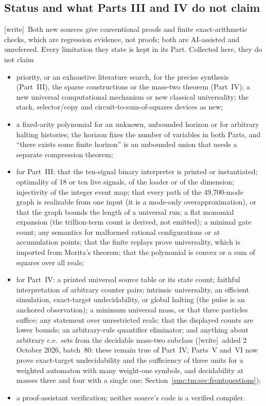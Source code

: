 \documentclass[11pt,letterpaper]{article}
\numberwithin{equation}{section}
\theoremstyle{definition}
\theoremstyle{remark}
\newcommand{\wtag}{\textup{[write]}}
\begin{document}
\subsection{Status and what Parts III and IV do not claim}\label{smc:cs:sec:status}

\wtag\ Both new sources give conventional proofs and finite exact-arithmetic checks, which are regression evidence, not proofs; both are AI-assisted and unrefereed. Every limitation they state is kept in its Part. Collected here, they do not claim
\begin{itemize}
\item priority, or an exhaustive literature search, for the precise synthesis (Part~III), the sparse constructions or the mass-two theorem (Part~IV); a new universal computational mechanism or new classical universality; the stack, selector/copy and circuit-to-sum-of-squares devices as new;
\item a fixed-arity polynomial for an unknown, unbounded horizon or for arbitrary halting histories; the horizon fixes the number of variables in both Parts, and ``there exists some finite horizon'' is an unbounded union that needs a separate compression theorem;
\item for Part~III: that the ten-signal binary interpreter is printed or instantiated; optimality of 18 or ten live signals, of the loader or of the dimension; injectivity of the integer event map; that every path of the 49,700-mode graph is realizable from one input (it is a mode-only overapproximation), or that the graph bounds the length of a universal run; a flat monomial expansion (the trillion-term count is derived, not emitted); a minimal gate count; any semantics for malformed rational configurations or at accumulation points; that the finite replays prove universality, which is imported from Morita's theorem; that the polynomial is convex or a sum of squares over all reals;
\item for Part~IV: a printed universal source table or its state count; faithful interpretation of arbitrary counter pairs; intrinsic universality, an efficient simulation, exact-target undecidability, or global halting (the pulse is an anchored observation); a minimum universal mass, or that three particles suffice; any statement over unrestricted reals; that the displayed counts are lower bounds; an arbitrary-rule quantifier eliminator; and anything about arbitrary c.e.\ sets from the decidable mass-two subclass (\wtag\ added 2 October 2026, batch~80: these remain true of Part~IV; Parts~V and~VI now prove exact-target undecidability and the sufficiency of three units for a weighted automaton with many weight-one symbols, and decidability at masses three and four with a single one; Section~\ref{smc:tm:sec:frontquestions});
\item a proof-assistant verification; neither source's code is a verified compiler.
\end{itemize}
\end{document}
